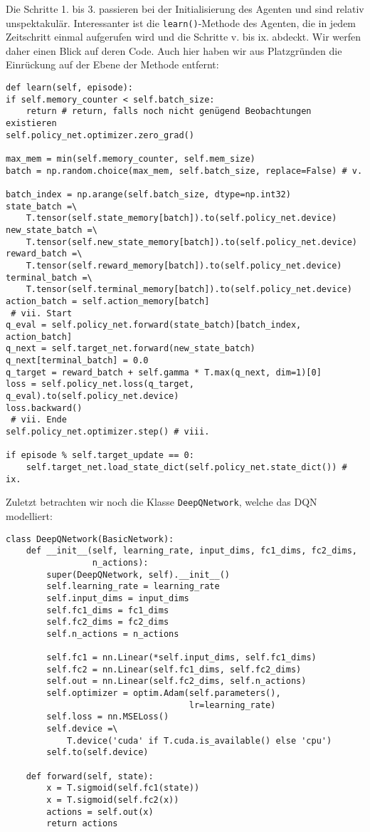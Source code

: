 Die Schritte 1. bis 3. passieren bei der Initialisierung des Agenten und sind relativ unspektakulär. Interessanter ist die \texttt{learn()}-Methode des Agenten, die in jedem Zeitschritt einmal aufgerufen wird und die Schritte v. bis ix. abdeckt. Wir werfen daher einen Blick auf deren Code. Auch hier haben wir aus Platzgründen die Einrückung auf der Ebene der Methode entfernt:
\begin{verbatim}
def learn(self, episode):
if self.memory_counter < self.batch_size:
    return # return, falls noch nicht genügend Beobachtungen existieren
self.policy_net.optimizer.zero_grad()

max_mem = min(self.memory_counter, self.mem_size)
batch = np.random.choice(max_mem, self.batch_size, replace=False) # v.

batch_index = np.arange(self.batch_size, dtype=np.int32)
state_batch =\
    T.tensor(self.state_memory[batch]).to(self.policy_net.device)
new_state_batch =\
    T.tensor(self.new_state_memory[batch]).to(self.policy_net.device)
reward_batch =\
    T.tensor(self.reward_memory[batch]).to(self.policy_net.device)
terminal_batch =\
    T.tensor(self.terminal_memory[batch]).to(self.policy_net.device)
action_batch = self.action_memory[batch]
 # vii. Start
q_eval = self.policy_net.forward(state_batch)[batch_index, action_batch]
q_next = self.target_net.forward(new_state_batch)
q_next[terminal_batch] = 0.0
q_target = reward_batch + self.gamma * T.max(q_next, dim=1)[0]
loss = self.policy_net.loss(q_target, q_eval).to(self.policy_net.device)
loss.backward()
 # vii. Ende
self.policy_net.optimizer.step() # viii.

if episode % self.target_update == 0:
    self.target_net.load_state_dict(self.policy_net.state_dict()) # ix.
\end{verbatim}
Zuletzt betrachten wir noch die Klasse \texttt{DeepQNetwork}, welche das DQN modelliert:
\begin{verbatim}
class DeepQNetwork(BasicNetwork):
    def __init__(self, learning_rate, input_dims, fc1_dims, fc2_dims,
                 n_actions):
        super(DeepQNetwork, self).__init__()
        self.learning_rate = learning_rate
        self.input_dims = input_dims
        self.fc1_dims = fc1_dims
        self.fc2_dims = fc2_dims
        self.n_actions = n_actions

        self.fc1 = nn.Linear(*self.input_dims, self.fc1_dims)
        self.fc2 = nn.Linear(self.fc1_dims, self.fc2_dims)
        self.out = nn.Linear(self.fc2_dims, self.n_actions)
        self.optimizer = optim.Adam(self.parameters(),
                                    lr=learning_rate)
        self.loss = nn.MSELoss()
        self.device =\
            T.device('cuda' if T.cuda.is_available() else 'cpu')
        self.to(self.device)

    def forward(self, state):
        x = T.sigmoid(self.fc1(state))
        x = T.sigmoid(self.fc2(x))
        actions = self.out(x)
        return actions
\end{verbatim}
